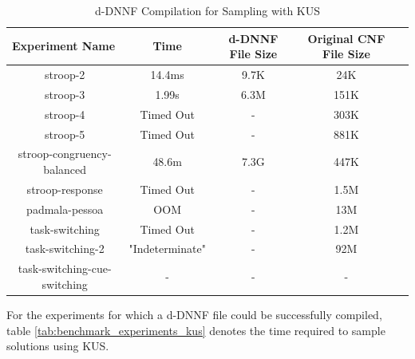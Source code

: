 \begin{table}[t]
  \centering
  \caption{d-DNNF Compilation for Sampling with KUS}
\begin{tabular}{|c|c|c|c|c|}
\hline
\multicolumn{1}{|l|}{Experiment Name} & Time            & d-DNNF File Size     & Original CNF File Size   \\ \hline
stroop-2                              & 14.4ms          & 9.7K                 & 24K                      \\ \hline
stroop-3                              & 1.99s           & 6.3M                 & 151K                     \\ \hline
stroop-4                              & Timed Out       & -                    & 303K                     \\ \hline
stroop-5                              & Timed Out       & -                    & 881K                     \\ \hline
stroop-congruency-balanced            & 48.6m           & 7.3G                 & 447K                     \\ \hline
stroop-response                       & Timed Out       & -                    & 1.5M                     \\ \hline
padmala-pessoa                        & OOM             & -                    & 13M                      \\ \hline
task-switching                        & Timed Out       & -                    & 1.2M                     \\ \hline
task-switching-2                      & "Indeterminate" & -                    & 92M                      \\ \hline %
task-switching-cue-switching          & -               & -                    & -                        \\ \hline
\end{tabular}
\label{tab:benchmark_experiments_d4}
\end{table}


For the experiments for which a d-DNNF file could be successfully compiled, table \ref{tab:benchmark_experiments_kus} denotes the time required to sample solutions using KUS.


